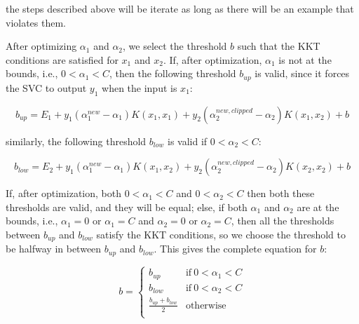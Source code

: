 the steps described above will be iterate as long as there will be an example that violates them.

After optimizing $\alpha_1$ and $\alpha_2$, we select the threshold $b$ such that the KKT conditions are satisfied for $x_1$ and $x_2$. If, after optimization, $\alpha_1$ is not at the bounds, i.e., $0 < \alpha_1 < C$, then the following threshold $b_{up}$ is valid, since it forces the SVC to output $y_1$ when the input is $x_1$:

\begin{equation} \label{eq:smo_svc_b1}
	b_{up} = E_1 + y_1 (\alpha_1^{new} - \alpha_1) K(x_1,x_1) + y_2 (\alpha_2^{new,clipped} - \alpha_2) K(x_1,x_2) + b
\end{equation}

similarly, the following threshold $b_{low}$ is valid if $0 < \alpha_2 < C$:

\begin{equation} \label{eq:smo_svc_b2}
	b_{low} = E_2 + y_1 (\alpha_1^{new} - \alpha_1) K(x_1,x_2) + y_2 (\alpha_2^{new,clipped} - \alpha_2) K(x_2,x_2) + b
\end{equation}

If, after optimization, both $0 < \alpha_1 < C$ and $0 < \alpha_2 < C$ then both these thresholds are valid, and they will be equal; else, if both $\alpha_1$ and $\alpha_2$ are at the bounds, i.e., $\alpha_1 = 0$ or $\alpha_1 = C$ and $\alpha_2 = 0$ or $\alpha_2 = C$, then all the thresholds between $b_{up}$ and $b_{low}$ satisfy the KKT conditions, so we choose the threshold to be halfway in between $b_{up}$ and $b_{low}$. This gives the complete equation for $b$:

\begin{equation} \label{eq:smo_svc_b}
	b =
        \begin{cases}
            b_{up} & \text{if} \ 0 < \alpha_1 < C \\
            b_{low} & \text{if} \ 0 < \alpha_2 < C \\
            \displaystyle \frac{b_{up}+b_{low}}{2} & \text{otherwise} \\
        \end{cases}
\end{equation}

\newpage

